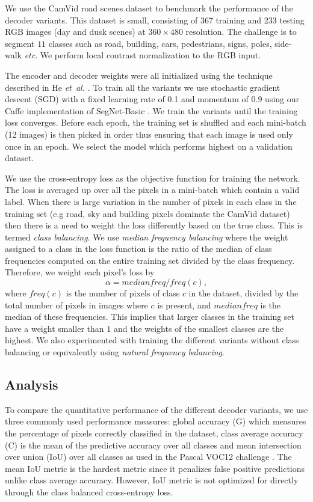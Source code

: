 We use the CamVid road scenes dataset \citep{brostow2009semantic} to benchmark the performance of the decoder variants. This dataset is small, consisting of 367 training and 233 testing RGB images (day and dusk scenes) at $360\times480$ resolution. The challenge is to segment $11$ classes such as road, building, cars, pedestrians, signs, poles, side-walk \textit{etc}. We perform local contrast normalization \citep{Jarrett} to the RGB input.

The encoder and decoder weights were all initialized using the technique described in He \emph{et~al.} \citep{he2015delving}. To train all the variants we use stochastic gradient descent (SGD) with a fixed learning rate of 0.1 and momentum of 0.9 \citep{Bottou} using our Caffe implementation of SegNet-Basic \citep{jia2014caffe}. We train the variants until the training loss converges. Before each epoch, the training set is shuffled and each mini-batch (12 images) is then picked in order thus ensuring that each image is used only once in an epoch. We select the model which performs highest on a validation dataset.

We use the cross-entropy loss \citep{long2015fully} as the objective function for training the network. The loss is averaged up over all the pixels in a mini-batch which contain a valid label. When there is large variation in the number of pixels in each class in the training set (e.g road, sky and building pixels dominate the CamVid dataset) then there is a need to weight the loss differently based on the true class. This is termed \textit{class balancing}. We use \textit{median frequency balancing} where the weight assigned to a class in the loss function is the ratio of the median of class frequencies computed on the entire training set divided by the class frequency. Therefore, we weight each pixel's loss by
\begin{equation}
\alpha = medianfreq / freq(c),
\end{equation}
where $freq(c)$ is the number of pixels of class $c$ in the dataset, divided by the total number of pixels in images where $c$ is present, and $medianfreq$ is the median of these frequencies.
This implies that larger classes in the training set have a weight smaller than $1$ and the weights of the smallest classes are the highest. We also experimented with training the different variants without class balancing or equivalently using \textit{natural frequency balancing}.

\subsection{Analysis}
\label{Analysis}
To compare the quantitative performance of the different decoder variants, we use three commonly used performance measures: global accuracy (G) which measures the percentage of pixels correctly classified in the dataset, class average accuracy (C) is the mean of the predictive accuracy over all classes and mean intersection over union (IoU) over all classes as used in the Pascal VOC12 challenge \citep{pascal}. The mean IoU metric is the hardest metric since it penalizes false positive predictions unlike class average accuracy. However, IoU metric is not optimized for directly through the class balanced cross-entropy loss. 

